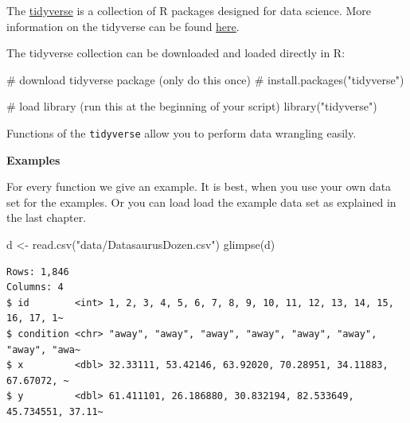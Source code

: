 \documentclass[
  letterpaper,
  DIV=11,
  numbers=noendperiod,
  oneside]{scrreprt}
\newenvironment{Shaded}{\begin{snugshade}}{\end{snugshade}}
\newcommand{\CommentTok}[1]{\textcolor[rgb]{0.37,0.37,0.37}{#1}}
\newcommand{\FunctionTok}[1]{\textcolor[rgb]{0.28,0.35,0.67}{#1}}
\newcommand{\NormalTok}[1]{\textcolor[rgb]{0.00,0.23,0.31}{#1}}
\newcommand{\OtherTok}[1]{\textcolor[rgb]{0.00,0.23,0.31}{#1}}
\newcommand{\StringTok}[1]{\textcolor[rgb]{0.13,0.47,0.30}{#1}}
\begin{document}
\hfill\break

The \href{https://www.tidyverse.org/}{tidyverse} is a collection of R
packages designed for data science. More information on the tidyverse
can be found \href{https://r4ds.had.co.nz/}{here}.

The tidyverse collection can be downloaded and loaded directly in R:

\begin{Shaded}
\begin{Highlighting}[]
\CommentTok{\# download tidyverse package (only do this once)}
\CommentTok{\# install.packages("tidyverse") }

\CommentTok{\# load library (run this at the beginning of your script)}
\FunctionTok{library}\NormalTok{(}\StringTok{"tidyverse"}\NormalTok{) }
\end{Highlighting}
\end{Shaded}

Functions of the \texttt{tidyverse} allow you to perform data wrangling
easily.

\begin{tcolorbox}[enhanced jigsaw, colframe=quarto-callout-tip-color-frame, bottomrule=.15mm, left=2mm, arc=.35mm, toprule=.15mm, opacityback=0, colback=white, rightrule=.15mm, breakable, leftrule=.75mm]
\begin{minipage}[t]{5.5mm}
\textcolor{quarto-callout-tip-color}{\faLightbulb}
\end{minipage}%
\begin{minipage}[t]{\textwidth - 5.5mm}

\textbf{Examples}\vspace{2mm}

For every function we give an example. It is best, when you use your own
data set for the examples. Or you can load load the example data set as
explained in the last chapter.

\begin{Shaded}
\begin{Highlighting}[]
\NormalTok{d }\OtherTok{\textless{}{-}} \FunctionTok{read.csv}\NormalTok{(}\StringTok{"data/DatasaurusDozen.csv"}\NormalTok{)}
\FunctionTok{glimpse}\NormalTok{(d)}
\end{Highlighting}
\end{Shaded}

\begin{verbatim}
Rows: 1,846
Columns: 4
$ id        <int> 1, 2, 3, 4, 5, 6, 7, 8, 9, 10, 11, 12, 13, 14, 15, 16, 17, 1~
$ condition <chr> "away", "away", "away", "away", "away", "away", "away", "awa~
$ x         <dbl> 32.33111, 53.42146, 63.92020, 70.28951, 34.11883, 67.67072, ~
$ y         <dbl> 61.411101, 26.186880, 30.832194, 82.533649, 45.734551, 37.11~
\end{verbatim}

\end{minipage}%
\end{tcolorbox}
\end{document}
